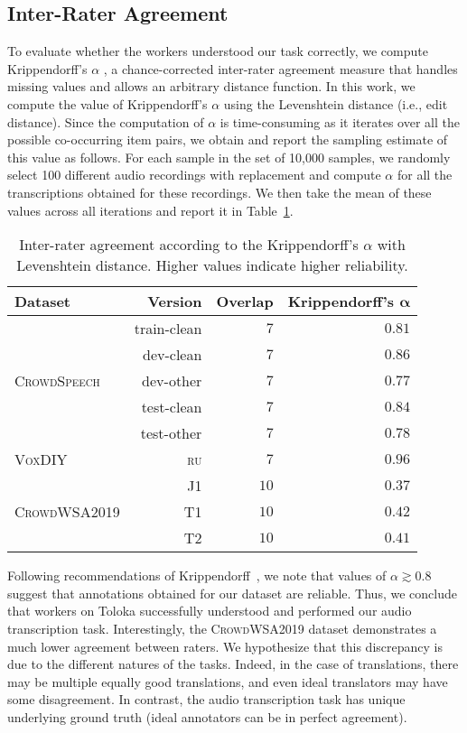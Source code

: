 \documentclass{article}
\newcommand{\speech}{\textsc{CrowdSpeech}}
\newcommand{\vox}{\textsc{VoxDIY}}
\newcommand{\crowd}{\textsc{CrowdWSA2019}}
\begin{document}
\subsection{Inter-Rater Agreement}

To evaluate whether the workers understood our task correctly, we compute Krippendorff's $\alpha$ \citep{Krippendorff:18}, a chance-corrected inter-rater agreement measure that handles missing values and allows an arbitrary distance function. In this work, we compute the value of Krippendorff's $\alpha$ using the Levenshtein distance (i.e., edit distance). Since the computation of $\alpha$ is time-consuming as it iterates over all the possible co-occurring item pairs, we obtain and report the sampling estimate of this value as follows. For each sample in the set of 10,000 samples, we randomly select 100 different audio recordings with replacement and compute $\alpha$ for all the transcriptions obtained for these recordings. We then take the mean of these values across all iterations and report it in Table~\ref{tab:alpha}.

\begin{table}[t]
  \caption{Inter-rater agreement according to the Krippendorff's $\alpha$ with Levenshtein distance. Higher values indicate higher reliability.}
  \centering
  \begin{tabular}{lrrr}\toprule
  \textbf{Dataset} & \textbf{Version} & \textbf{Overlap} & \textbf{Krippendorff's} $\bm{\alpha}$  \\\midrule
  \multirow{5}{*}{\speech} & train-clean & $7$ & $0.81$  \\
   & dev-clean & $7$ & $0.86$  \\
   & dev-other & $7$ & $0.77$  \\
   & test-clean & $7$ & $0.84$  \\
   & test-other & $7$ & $0.78$ \\
  \midrule
  {\vox} & \textsc{ru} & $7$ & $0.96$  \\\midrule
  \multirow{3}{*}{\crowd} & J1 & $10$ & $0.37$ \\
   & T1 & $10$ & $0.42$  \\
   & T2 & $10$ & $0.41$  \\\bottomrule
  \end{tabular}
  \label{tab:alpha}
\end{table}

Following recommendations of Krippendorff~\citep{Krippendorff:18}, we note that values of $\alpha \gtrsim 0.8$ suggest that annotations obtained for our dataset are reliable. Thus, we conclude that workers on Toloka successfully understood and performed our audio transcription task. Interestingly, the \crowd{} dataset demonstrates a much lower agreement between raters. We hypothesize that this discrepancy is due to the different natures of the tasks. Indeed, in the case of translations, there may be multiple equally good translations, and even ideal translators may have some disagreement. In contrast, the audio transcription task has unique underlying ground truth (ideal annotators can be in perfect agreement).
\end{document}
